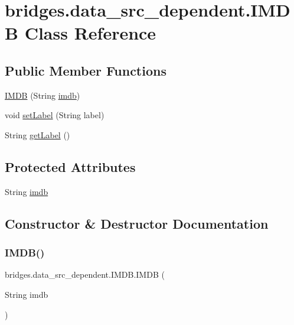 \hypertarget{classbridges_1_1data__src__dependent_1_1_i_m_d_b}{}\section{bridges.\+data\+\_\+src\+\_\+dependent.\+I\+M\+DB Class Reference}
\label{classbridges_1_1data__src__dependent_1_1_i_m_d_b}
\subsection*{Public Member Functions}
\begin{DoxyCompactItemize}
\item 
\hyperlink{classbridges_1_1data__src__dependent_1_1_i_m_d_b_aff9987e893b16275182bc81b7e64b048}{I\+M\+DB} (String \hyperlink{classbridges_1_1data__src__dependent_1_1_i_m_d_b_a2913407abe6019a396d4a2ac086283df}{imdb})
\item 
void \hyperlink{classbridges_1_1data__src__dependent_1_1_i_m_d_b_a9022297c43873b9df0ad6d3c91977bd8}{set\+Label} (String label)
\item 
String \hyperlink{classbridges_1_1data__src__dependent_1_1_i_m_d_b_ad2d0e1edabdb0596a3308c160f63cb2b}{get\+Label} ()
\end{DoxyCompactItemize}
\subsection*{Protected Attributes}
\begin{DoxyCompactItemize}
\item 
String \hyperlink{classbridges_1_1data__src__dependent_1_1_i_m_d_b_a2913407abe6019a396d4a2ac086283df}{imdb}
\end{DoxyCompactItemize}


\subsection{Constructor \& Destructor Documentation}
\hypertarget{classbridges_1_1data__src__dependent_1_1_i_m_d_b_aff9987e893b16275182bc81b7e64b048}{}\label{classbridges_1_1data__src__dependent_1_1_i_m_d_b_aff9987e893b16275182bc81b7e64b048} 
\subsubsection{\texorpdfstring{I\+M\+D\+B()}{IMDB()}}
{\footnotesize\ttfamily bridges.\+data\+\_\+src\+\_\+dependent.\+I\+M\+D\+B.\+I\+M\+DB (\begin{DoxyParamCaption}\item[{String}]{imdb }\end{DoxyParamCaption})}


